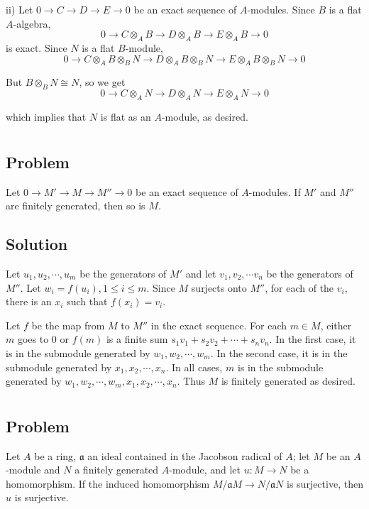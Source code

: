 \documentclass[book,12pt,oneside,openany]{memoir}
\begin{document}
ii) Let $0 \rightarrow C \rightarrow D \rightarrow E \rightarrow 0$ be an exact sequence of $A$-modules. Since $B$ is a flat $A$-algebra, \[0 \rightarrow C \otimes_A B \rightarrow D \otimes_A B \rightarrow E \otimes_A B \rightarrow 0\] is exact. Since $N$ is a flat $B$-module, \[0 \rightarrow C \otimes_A B \otimes_B N \rightarrow D \otimes_A B \otimes_B N \rightarrow E \otimes_A B \otimes_B N \rightarrow 0\] 

But $B \otimes_B N \cong N$, so we get 
 \[0 \rightarrow C \otimes_A  N \rightarrow D \otimes_A N \rightarrow E \otimes_A  N \rightarrow 0\] 

which implies that $N$ is flat as an $A$-module, as desired.
\section{}
\subsection{Problem}
Let $0 \rightarrow M' \rightarrow M \rightarrow M'' \rightarrow 0$ be an exact sequence of $A$-modules. If $M'$ and $M''$ are finitely generated, then so is $M$.

\subsection{Solution}
Let $u_1, u_2, \cdots, u_m$ be the generators of $M'$ and let $v_1, v_2, \cdots v_n$ be the generators of $M''$. Let $w_i = f(u_i), 1 \leq i \leq m$. Since $M$ surjects onto $M''$, for each of the $v_i$, there is an $x_i$ such that $f(x_i) = v_i$.

Let $f$ be the map from $M$ to $M''$ in the exact sequence. For each $m \in M$, either $m$ goes to 0 or $f(m)$ is a finite sum $s_1 v_1 + s_2 v_2 + \cdots + s_n v_n$. In the first case, it is in the submodule generated by $w_1, w_2, \cdots, w_m$. In the second case, it is in the submodule generated by $x_1, x_2, \cdots, x_n$. In all cases, $m$ is in the submodule generated by $w_1, w_2, \cdots, w_m, x_1, x_2, \cdots, x_n$. Thus $M$ is finitely generated as desired.

\section{}
\subsection{Problem}
Let $A$ be a ring, $\mathfrak{a}$ an ideal contained in the Jacobson radical of $A$; let $M$ be an $A$-module and $N$ a finitely generated $A$-module, and let $u: M \rightarrow N$ be a homomorphism. If the induced homomorphism $M/\mathfrak{a}M \rightarrow N/\mathfrak{a}N$ is surjective, then $u$ is surjective.
\end{document}
